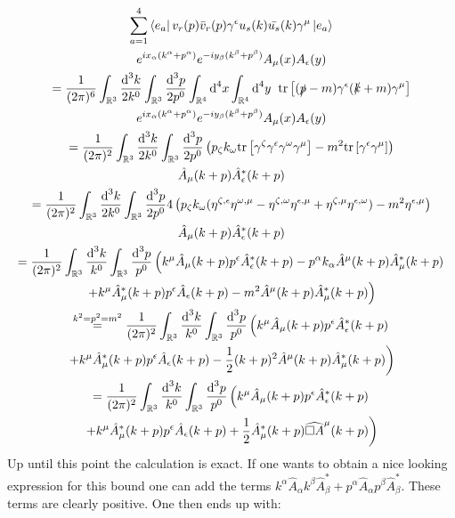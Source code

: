\documentclass[a4paper,12pt]{article}
\newcommand{\equalmath}[1]{\ensuremath{\stackrel{#1}{=}}}
\begin{document}
\begin{multline}
 \sum_{a=1}^4 \left<e_a\right| v_r (p) \bar{v}_{r} (p) \gamma^\epsilon u_{s}(k) 
  \bar{u_s}(k) \gamma^\mu \left|e_a\right>  \\
  e^{i x_\alpha (k^\alpha + p^\alpha)} e^{-i y_\beta (k^\beta + p^\beta)} 
 A_{\mu} (x) A_{\epsilon} (y)  \\
=\frac{1}{(2\pi)^6}  \int_{\mathbb{R}^3} \frac{\text{d}^3k}{2 k^0} \int_{\mathbb{R}^3} \frac{\text{d}^3p}{2 p^0} \int_{\mathbb{R}^4}\text{d}^4x\int_{\mathbb{R}^4} \text{d}^4y 
 \hspace{0,2cm}\text{tr}\left[ (\slashed{p}-m) \gamma^\epsilon (\slashed{k}+m) \gamma^\mu \right]  \\
 e^{i x_\alpha (k^\alpha + p^\alpha)} e^{-i y_\beta (k^\beta + p^\beta)} 
 A_{\mu} (x) A_{\epsilon} (y)  \\
 =\frac{1}{(2\pi)^2}  \int_{\mathbb{R}^3} \frac{\text{d}^3k}{2 k^0} \int_{\mathbb{R}^3} \frac{\text{d}^3p}{2 p^0}
 \left(p_\zeta k_\omega\text{tr}\left[ \gamma^\zeta \gamma^\epsilon \gamma^\omega \gamma^\mu \right] -m^2\text{tr}\left[ \gamma^\epsilon \gamma^\mu \right] \right) \\
 \hat{A}_{\mu} (k+p) \hat{A}^*_{\epsilon} (k+p)  \\
  =\frac{1}{(2\pi)^2}  \int_{\mathbb{R}^3} \frac{\text{d}^3k}{2 k^0} \int_{\mathbb{R}^3} \frac{\text{d}^3p}{2 p^0}4
 \left(p_\zeta k_\omega(\eta^{\zeta,\epsilon}\eta^{\omega,\mu} -\eta^{\zeta,\omega}\eta^{\epsilon,\mu} +\eta^{\zeta,\mu}\eta^{\epsilon,\omega}) -m^2\eta^{\epsilon,\mu} \right) \\
 \hat{A}_{\mu} (k+p) \hat{A}^*_{\epsilon} (k+p)  \\
   =\frac{1}{(2\pi)^2}  \int_{\mathbb{R}^3} \frac{\text{d}^3k}{ k^0} \int_{\mathbb{R}^3} \frac{\text{d}^3p}{ p^0}
 \left(k^\mu \hat{A}_{\mu} (k+p) p^\epsilon\hat{A}^*_{\epsilon} (k+p)  -p^\alpha k_\alpha \hat{A}^{\mu} (k+p) \hat{A}^*_{\mu} (k+p)\right.\\
 \left.    +k^\mu \hat{A}^*_{\mu} (k+p) p^\epsilon\hat{A}_{\epsilon} (k+p)
  -m^2\hat{A}^{\mu} (k+p) \hat{A}^*_{\mu} (k+p)  \right) \\
  \equalmath{k^2=p^2=m^2} \frac{1}{(2\pi)^2}  \int_{\mathbb{R}^3} \frac{\text{d}^3k}{ k^0} \int_{\mathbb{R}^3} \frac{\text{d}^3p}{ p^0}
 \left(k^\mu \hat{A}_{\mu} (k+p) p^\epsilon\hat{A}^*_{\epsilon} (k+p) \right.\\
 \left.    +k^\mu \hat{A}^*_{\mu} (k+p) p^\epsilon\hat{A}_{\epsilon} (k+p)
  -\frac{1}{2}(k+p)^2 \hat{A}^{\mu} (k+p) \hat{A}^*_{\mu} (k+p)  \right) \\
    = \frac{1}{(2\pi)^2}  \int_{\mathbb{R}^3} \frac{\text{d}^3k}{ k^0} \int_{\mathbb{R}^3} \frac{\text{d}^3p}{ p^0}
 \left(k^\mu \hat{A}_{\mu} (k+p) p^\epsilon\hat{A}^*_{\epsilon} (k+p) \right.\\
 \left.    +k^\mu \hat{A}^*_{\mu} (k+p) p^\epsilon\hat{A}_{\epsilon} (k+p)
  +\frac{1}{2} \hat{A}^*_{\mu} (k+p)  \widehat{\Box A}^{\mu} (k+p) \right) 
\end{multline}
Up until this point the calculation is exact. If one wants to obtain a nice looking expression for this bound one can add the terms \( k^\alpha \hat{A}_\alpha  k^\beta \hat{A}^*_\beta +p^\alpha  \hat{A}_\alpha  p^\beta \hat{A}^*_\beta \). These terms are clearly positive. One then ends up with:
\end{document}
